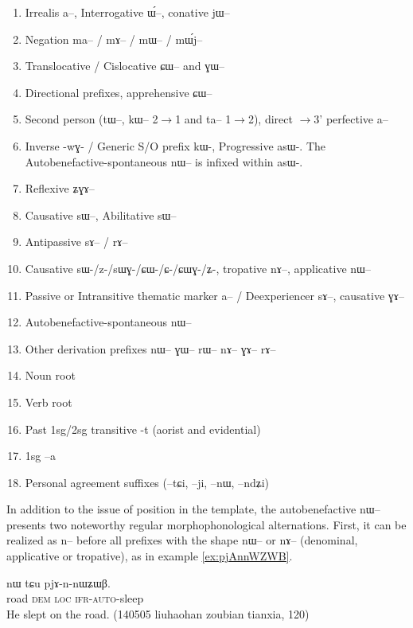 \documentclass[oldfontcommands,oneside,a4paper,11pt]{article}
\newcommand{\ipa}[1]{{\phon \mbox{#1}}} %
\begin{document}
\begin{landscape}
\begin{multicols}{2}
\begin{enumerate}
\item Irrealis  \ipa{a}--, Interrogative \ipa{ɯ́}--, conative \ipa{jɯ}--
\item Negation \ipa{ma}-- / \ipa{mɤ}-- / \ipa{mɯ}-- / \ipa{mɯ́j}--
\item Translocative / Cislocative \ipa{ɕɯ}-- and \ipa{ɣɯ}--
\item Directional prefixes, apprehensive \ipa{ɕɯ}--
\item Second person (\ipa{tɯ}--, \ipa{kɯ}-- 2$\rightarrow$1 and  \ipa{ta--} 1$\rightarrow$2), direct $\rightarrow$3' perfective \ipa{a--}
\item Inverse -\ipa{wɣ}- / Generic S/O prefix \ipa{kɯ}-, Progressive \ipa{asɯ}-. The Autobenefactive-spontaneous \ipa{nɯ}-- is infixed within \ipa{asɯ}-.
\item Reflexive \ipa{ʑɣɤ}-- 
\item Causative \ipa{sɯ}--, Abilitative \ipa{sɯ}--
\item  Antipassive  \ipa{sɤ}-- / \ipa{rɤ}--
\item Causative \ipa{sɯ-/z-/sɯɣ-/ɕɯ-/ɕ-/ɕɯɣ-/ʑ-}, tropative \ipa{nɤ}--, applicative \ipa{nɯ}--
\item Passive or Intransitive thematic marker \ipa{a}-- / Deexperiencer \ipa{sɤ}--, causative \ipa{ɣɤ--}
\item Autobenefactive-spontaneous \ipa{nɯ}--
\item Other derivation prefixes \ipa{nɯ}-- \ipa{ɣɯ}-- \ipa{rɯ}-- \ipa{nɤ}-- \ipa{ɣɤ}-- \ipa{rɤ}--
\item Noun root
\item Verb root 
\item Past 1sg/2sg transitive -\ipa{t} (aorist and evidential)
\item 1sg --\ipa{a}
\item Personal agreement suffixes (--\ipa{tɕi}, --\ipa{ji}, --\ipa{nɯ}, --\ipa{ndʑi})
\end{enumerate}


\end{multicols}
  \end{landscape}
 
 
In addition to the issue of position in the template, the autobenefactive \ipa{nɯ--} presents two noteworthy regular morphophonological alternations. First, it can be realized as \ipa{n--} before all prefixes with the shape \ipa{nɯ--} or \ipa{nɤ--} (denominal, applicative or tropative), as in example \ref{ex:pjAnnWZWB}.
 
 \begin{exe}
\ex \label{ex:pjAnnWZWB}
\gll  \ipa{tʂu} 	\ipa{nɯ} \ipa{tɕu} \ipa{pjɤ-n-nɯʑɯβ.} \\
road \textsc{dem} \textsc{loc} \textsc{ifr-auto}-sleep \\
\glt He slept on the road. (140505 liuhaohan zoubian tianxia, 120)
\end{exe}
\end{document}
